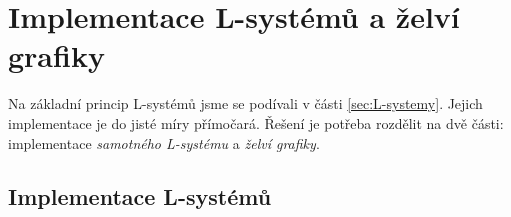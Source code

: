\section{Implementace L-systémů a želví grafiky}\label{sec:implementace-lsystemu-a-zelvi-grafiky}

Na základní princip L-systémů jsme se podívali v části \ref{sec:L-systemy}. Jejich implementace je do jisté míry přímočará. Řešení je potřeba rozdělit na dvě části: implementace \emph{samotného L-systému} a \emph{želví grafiky}.

\subsection{Implementace L-systémů}\label{subsec:implementace-lsystemu}


